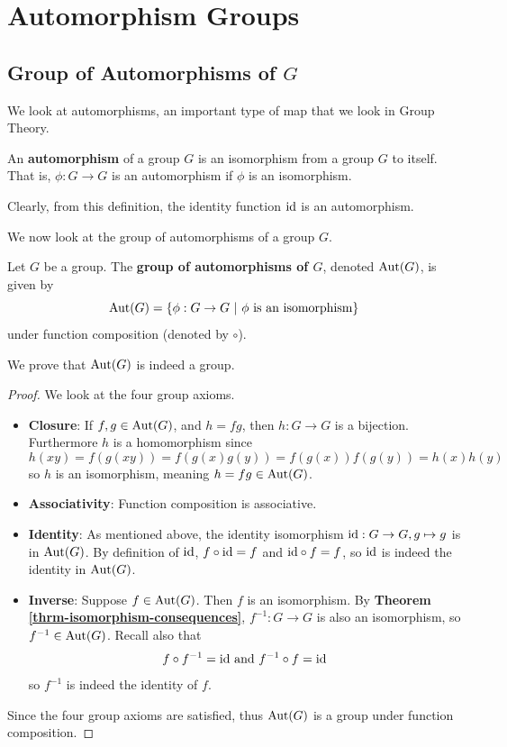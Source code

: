 \section{Automorphism Groups}
\subsection{Group of Automorphisms of $G$}
We look at automorphisms, an important type of map that we look in Group Theory.
\begin{definition}
    An \textbf{automorphism} of a group $G$ is an isomorphism from a group $G$ to itself. That is, $\phi: G \to G$ is an automorphism if $\phi$ is an isomorphism.
\end{definition}
Clearly, from this definition, the identity function $\mathrm{id}$ is an automorphism.

We now look at the group of automorphisms of a group $G$.
\begin{definition}
    Let $G$ be a group. The \textbf{group of automorphisms of $G$}, denoted $\mathrm{Aut}(G)$, is given by
    \[
        \mathrm{Aut}(G) = \{\phi: G \to G \ | \ \phi \text{ is an isomorphism}\}
    \]
    under function composition (denoted by $\circ$).
\end{definition}
We prove that $\mathrm{Aut}(G)$ is indeed a group.
\begin{proof}
    We look at the four group axioms.
    \begin{itemize}
        \item \textbf{Closure}: If $f, g \in \mathrm{Aut}(G)$, and $h = fg$, then $h: G \to G$ is a bijection. Furthermore $h$ is a homomorphism since
        \[
            h(xy) = f(g(xy)) = f(g(x)g(y)) = f(g(x))f(g(y)) = h(x)h(y)
        \]
        so $h$ is an isomorphism, meaning $h = fg \in \mathrm{Aut}(G)$.

        \item \textbf{Associativity}: Function composition is associative.

        \item \textbf{Identity}: As mentioned above, the identity isomorphism $\mathrm{id}: G \to G, g \mapsto g$ is in $\mathrm{Aut}(G)$. By definition of $\mathrm{id}$, $f \circ \mathrm{id} = f$ and $\mathrm{id} \circ f = f$, so $\mathrm{id}$ is indeed the identity in $\mathrm{Aut}(G)$.

        \item \textbf{Inverse}: Suppose $f \in \mathrm{Aut}(G)$. Then $f$ is an isomorphism. By \textbf{Theorem \ref{thrm-isomorphism-consequences}}, $f^{-1}: G \to G$ is also an isomorphism, so $f^{-1} \in \mathrm{Aut}(G)$. Recall also that
        \[
            f\circ f^{-1} = \mathrm{id} \text{ and } f^{-1}\circ f = \mathrm{id}
        \]
        so $f^{-1}$ is indeed the identity of $f$.
    \end{itemize}
    Since the four group axioms are satisfied, thus $\mathrm{Aut}(G)$ is a group under function composition.
\end{proof}

